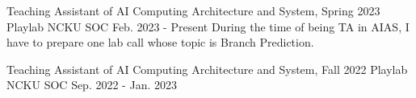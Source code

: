 

\begin{cventries}

  \cventry
  {Teaching Assistant of AI Computing Architecture and System, Spring 2023} %
  {Playlab} %
  {NCKU SOC} %
  {Feb. 2023 - Present} %
  {During the time of being TA in AIAS, I have to prepare one lab call whose topic is Branch Prediction.}

  \cventry
  {Teaching Assistant of AI Computing Architecture and System, Fall 2022}
  {Playlab}
  {NCKU SOC}
  {Sep. 2022 - Jan. 2023}
  {}

\end{cventries}
